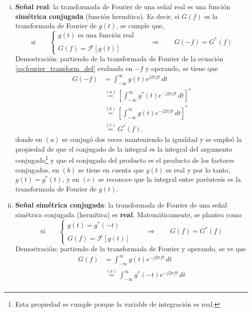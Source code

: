 \documentclass[a4paper]{article}
\begin{document}
\begin{enumerate}[(i)]
 \item \textbf{Señal real}: la transformada de Fourier de una señal real es una función \textbf{simétrica conjugada} (función hermítica). Es decir, si \(G(f)\) es la transformada de Fourier de \(g(t)\), se cumple que,
 \[
  \textrm{si}\qquad
  \left\{\begin{array}{l}
  g(t)\textrm{ es una función real}\\
  \\
  G(f)=\mathcal{F}\left[g(t)\right] \end{array} \right.
  \qquad\Rightarrow\qquad G(-f)=G^*(f)
 \]
 Demostración: partiendo de la transformada de Fourier de la ecuación \ref{eq:fourier_transform_def} evaluada en \(-f\) y operando, se tiene que
 \begin{align*}
  G(-f)&=\int_{-\infty}^{\infty}g(t)e^{j2\pi ft}\,dt\\
    &\overset{(a)}{=}\left[\int_{-\infty}^{\infty}g^*(t)e^{-j2\pi ft}\,dt\right]^*\\
    &\overset{(b)}{=}\left[\int_{-\infty}^{\infty}g(t)e^{-j2\pi ft}\,dt\right]^*\\
    &\overset{(c)}{=}G^*(f),
 \end{align*}
donde en \((a)\) se conjugó dos veces manteniendo la igualdad y se empleó la propiedad de que el conjugado de la integral es la integral del argumento conjugado\footnote{Esta propiedad se cumple porque la variable de integración es real.} y que el conjugado del producto es el producto de los factores conjugados, en \((b)\) se tiene en cuenta que \(g(t)\) es real y por lo tanto, \(g(t)=g^*(t)\), y en \((c)\) se reconoce que la integral entre paréntesis es la transformada de Fourier de \(g(t)\).
\item \textbf{Señal simétrica conjugada}: la transformada de Fourier de una señal simétrica conjugada (hermítica) es \textbf{real}. Matemáticamente, se plantea como
\[
  \textrm{si}\qquad
  \left\{\begin{array}{l}
  g(t)=g^*(-t)\\
  \\
  G(f)=\mathcal{F}\left[g(t)\right] \end{array} \right.
  \qquad\Rightarrow\qquad G(f)=G^*(f)
 \]
 Demostración: partiendo de la transformada de Fourier y operando, se ve que
\begin{align*}
  G(f)&=\int_{-\infty}^{\infty}g(t)e^{-j2\pi ft}\,dt\\
    &\overset{(a)}{=}\int_{-\infty}^{\infty}g^*(-t)e^{-j2\pi ft}\,dt\\

\end{align*}
\end{enumerate}
\end{document}
